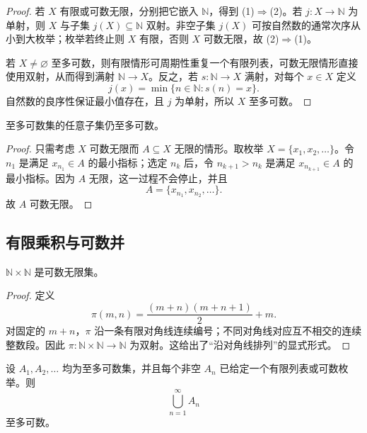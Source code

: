 \begin{proof}
若 \(X\) 有限或可数无限，分别把它嵌入 \(\mathbb N\)，得到 (1)\(\Rightarrow\)(2)。若 \(j:X\to\mathbb N\) 为单射，则 \(X\) 与子集 \(j(X)\subseteq\mathbb N\) 双射。非空子集 \(j(X)\) 可按自然数的通常次序从小到大枚举；枚举若终止则 \(X\) 有限，否则 \(X\) 可数无限，故 (2)\(\Rightarrow\)(1)。

若 \(X\ne\varnothing\) 至多可数，则有限情形可周期性重复一个有限列表，可数无限情形直接使用双射，从而得到满射 \(\mathbb N\to X\)。反之，若 \(s:\mathbb N\to X\) 满射，对每个 \(x\in X\) 定义
\[
  j(x)=\min\{n\in\mathbb N:s(n)=x\}.
\]
自然数的良序性保证最小值存在，且 \(j\) 为单射，所以 \(X\) 至多可数。
\end{proof}

\begin{proposition}
至多可数集的任意子集仍至多可数。
\end{proposition}

\begin{proof}
只需考虑 \(X\) 可数无限而 \(A\subseteq X\) 无限的情形。取枚举 \(X=\{x_1,x_2,\ldots\}\)。令 \(n_1\) 是满足 \(x_{n_1}\in A\) 的最小指标；选定 \(n_k\) 后，令 \(n_{k+1}>n_k\) 是满足 \(x_{n_{k+1}}\in A\) 的最小指标。因为 \(A\) 无限，这一过程不会停止，并且
\[
  A=\{x_{n_1},x_{n_2},\ldots\}.
\]
故 \(A\) 可数无限。
\end{proof}

\subsection{有限乘积与可数并}

\begin{proposition}
\(\mathbb N\times\mathbb N\) 是可数无限集。
\end{proposition}

\begin{proof}
定义
\[
  \pi(m,n)=\frac{(m+n)(m+n+1)}2+m.
\]
对固定的 \(m+n\)，\(\pi\) 沿一条有限对角线连续编号；不同对角线对应互不相交的连续整数段。因此 \(\pi:\mathbb N\times\mathbb N\to\mathbb N\) 为双射。这给出了“沿对角线排列”的显式形式。
\end{proof}

\begin{theorem}[可数并定理]
设 \(A_1,A_2,\ldots\) 均为至多可数集，并且每个非空 \(A_n\) 已给定一个有限列表或可数枚举。则
\[
  \bigcup_{n=1}^{\infty}A_n
\]
至多可数。
\end{theorem}

